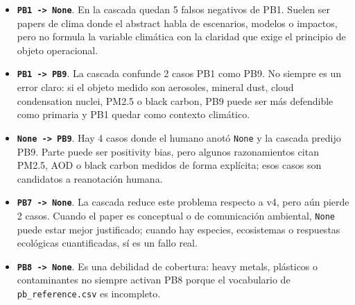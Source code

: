 \begin{itemize}
\item \textbf{\texttt{PB1 -> None}}. En la cascada quedan 5 falsos negativos de PB1. Suelen ser papers de clima donde el abstract habla de escenarios, modelos o impactos, pero no formula la variable climática con la claridad que exige el principio de objeto operacional.
\item \textbf{\texttt{PB1 -> PB9}}. La cascada confunde 2 casos PB1 como PB9. No siempre es un error claro: si el objeto medido son aerosoles, mineral dust, cloud condensation nuclei, PM2.5 o black carbon, PB9 puede ser más defendible como primaria y PB1 quedar como contexto climático.
\item \textbf{\texttt{None -> PB9}}. Hay 4 casos donde el humano anotó \texttt{None} y la cascada predijo PB9. Parte puede ser positivity bias, pero algunos razonamientos citan PM2.5, AOD o black carbon medidos de forma explícita; esos casos son candidatos a reanotación humana.
\item \textbf{\texttt{PB7 -> None}}. La cascada reduce este problema respecto a v4, pero aún pierde 2 casos. Cuando el paper es conceptual o de comunicación ambiental, \texttt{None} puede estar mejor justificado; cuando hay especies, ecosistemas o respuestas ecológicas cuantificadas, sí es un fallo real.
\item \textbf{\texttt{PB8 -> None}}. Es una debilidad de cobertura: heavy metals, plásticos o contaminantes no siempre activan PB8 porque el vocabulario de \texttt{pb\_reference.csv} es incompleto.
\end{itemize}

